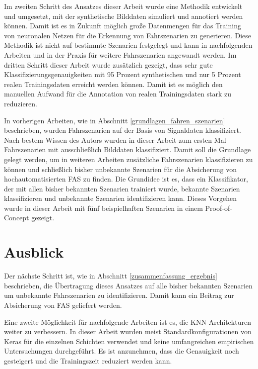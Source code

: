 Im zweiten Schritt des Ansatzes dieser Arbeit wurde eine Methodik entwickelt und umgesetzt, mit der synthetische Bilddaten simuliert und annotiert werden können. Damit ist es in Zukunft möglich große Datenmengen für das Training von neuronalen Netzen für die Erkennung von Fahrszenarien zu generieren. Diese Methodik ist nicht auf bestimmte Szenarien festgelegt und kann in nachfolgenden Arbeiten und in der Praxis für weitere Fahrszenarien angewandt werden. Im dritten Schritt dieser Arbeit wurde zusätzlich gezeigt, dass sehr gute Klassifizierungsgenauigkeiten mit 95 Prozent synthetischen und nur 5 Prozent realen Trainingsdaten erreicht werden können. Damit ist es möglich den manuellen Aufwand für die Annotation von realen Trainingsdaten stark zu reduzieren.

In vorherigen Arbeiten, wie in Abschnitt \ref{grundlagen_fahren_szenarien} beschrieben, wurden Fahrszenarien auf der Basis von Signaldaten klassifiziert. Nach bestem Wissen des Autors wurden in dieser Arbeit zum ersten Mal Fahrszenarien mit ausschließlich Bilddaten klassifiziert. Damit soll die Grundlage gelegt werden, um in weiteren Arbeiten zusätzliche Fahrszenarien klassifizieren zu können und schließlich bisher unbekannte Szenarien für die Absicherung von hochautomatisierten \ac{FAS} zu finden. Die Grundidee ist es, dass ein Klassifikator, der mit allen bisher bekannten Szenarien trainiert wurde, bekannte Szenarien klassifizieren und unbekannte Szenarien identifizieren kann. Dieses Vorgehen wurde in dieser Arbeit mit fünf beispielhaften Szenarien in einem Proof-of-Concept gezeigt.
 
 \section{Ausblick}
 \label{zusammenfassung_ausblick}

Der nächste Schritt ist, wie in Abschnitt \ref{zusammenfassung_ergebnis} beschrieben, die Übertragung dieses Ansatzes auf alle bisher bekannten Szenarien um unbekannte Fahrszenarien zu identifizieren. Damit kann ein Beitrag zur Absicherung von \ac{FAS} geliefert werden.

Eine zweite Möglichkeit für nachfolgende Arbeiten ist es, die \ac{KNN}-Architekturen weiter zu verbessern. In dieser Arbeit wurden meist Standardkonfigurationen von Keras \cite{chollet2015keras} für die einzelnen Schichten verwendet und keine umfangreichen empirischen Untersuchungen durchgeführt. Es ist anzunehmen, dass die Genauigkeit noch gesteigert und die Trainingszeit reduziert werden kann.

